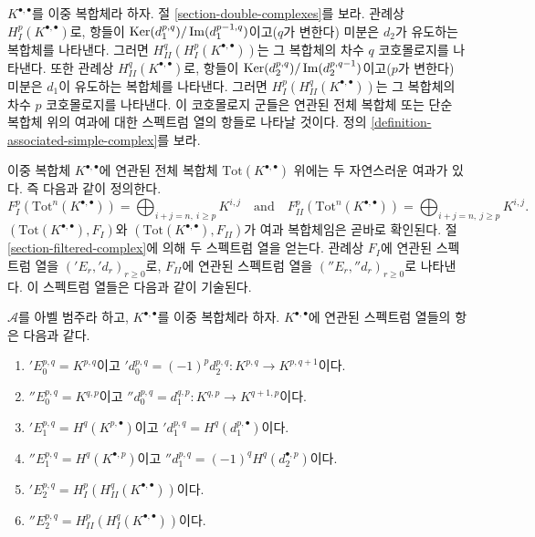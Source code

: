 \noindent
$K^{\bullet, \bullet}$를 이중 복합체라 하자. 절
\ref{section-double-complexes}를 보라. 관례상
$H^p_I(K^{\bullet, \bullet})$로, 항들이
$\mathop{\mathrm{Ker}}(d_1^{p, q})/\mathop{\mathrm{Im}}(d_1^{p - 1, q})$이고($q$가 변한다) 미분은
$d_2$가 유도하는 복합체를 나타낸다.
그러면 $H^q_{II}(H^p_I(K^{\bullet, \bullet}))$는 그 복합체의 차수
$q$ 코호몰로지를 나타낸다. 또한 관례상
$H^q_{II}(K^{\bullet, \bullet})$로, 항들이
$\mathop{\mathrm{Ker}}(d_2^{p, q})/\mathop{\mathrm{Im}}(d_2^{p, q - 1})$이고($p$가 변한다) 미분은
$d_1$이 유도하는 복합체를 나타낸다.
그러면 $H^p_I(H^q_{II}(K^{\bullet, \bullet}))$는 그 복합체의 차수
$p$ 코호몰로지를 나타낸다. 이 코호몰로지 군들은 연관된 전체 복합체
또는 단순 복합체 위의 여과에 대한 스펙트럼 열의 항들로 나타날 것이다.
정의 \ref{definition-associated-simple-complex}를 보라.

\medskip\noindent
이중 복합체 $K^{\bullet, \bullet}$에 연관된 전체 복합체
$\text{Tot}(K^{\bullet, \bullet})$ 위에는 두 자연스러운 여과가 있다.
즉 다음과 같이 정의한다.
$$
F_I^p(\text{Tot}^n(K^{\bullet, \bullet})) =
\bigoplus\nolimits_{i + j = n, \ i \geq p} K^{i, j}
\quad
\text{and}
\quad
F_{II}^p(\text{Tot}^n(K^{\bullet, \bullet})) =
\bigoplus\nolimits_{i + j = n, \ j \geq p} K^{i, j}.
$$
$(\text{Tot}(K^{\bullet, \bullet}), F_I)$와
$(\text{Tot}(K^{\bullet, \bullet}), F_{II})$가 여과 복합체임은 곧바로
확인된다. 절 \ref{section-filtered-complex}에 의해 두 스펙트럼 열을
얻는다. 관례상 $F_I$에 연관된 스펙트럼 열을
$({}'E_r, {}'d_r)_{r \geq 0}$로, $F_{II}$에 연관된 스펙트럼 열을
$({}''E_r, {}''d_r)_{r \geq 0}$로 나타낸다.
이 스펙트럼 열들은 다음과 같이 기술된다.

\begin{lemma}
\label{lemma-ss-double-complex}
$\mathcal{A}$를 아벨 범주라 하고, $K^{\bullet, \bullet}$를 이중
복합체라 하자. $K^{\bullet, \bullet}$에 연관된 스펙트럼 열들의 항은
다음과 같다.
\begin{enumerate}
\item ${}'E_0^{p, q} = K^{p, q}$이고
${}'d_0^{p, q} = (-1)^p d_2^{p, q} : K^{p, q} \to K^{p, q + 1}$이다.
\item ${}''E_0^{p, q} = K^{q, p}$이고
${}''d_0^{p, q} = d_1^{q, p} : K^{q, p} \to K^{q + 1, p}$이다.
\item ${}'E_1^{p, q} = H^q(K^{p, \bullet})$이고
${}'d_1^{p, q} = H^q(d_1^{p, \bullet})$이다.
\item ${}''E_1^{p, q} = H^q(K^{\bullet, p})$이고
${}''d_1^{p, q} = (-1)^q H^q(d_2^{\bullet, p})$이다.
\item ${}'E_2^{p, q} = H^p_I(H^q_{II}(K^{\bullet, \bullet}))$이다.
\item ${}''E_2^{p, q} = H^p_{II}(H^q_I(K^{\bullet, \bullet}))$이다.
\end{enumerate}
\end{lemma}

